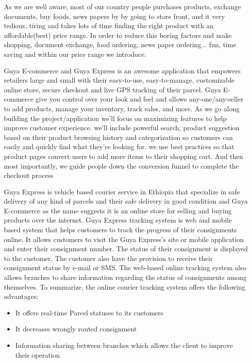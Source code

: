 As we are well aware, most of our country people purchases products, exchange documents, buy foods, news papers by by going to store front, and it very tedious, tiring and takes lots of time finding the right product with an affordable(best) price range. In order to reduce this boring factors and make shopping, document exchange, food ordering, news paper ordering... fun, time saving and within our price range we introduce.

Guya E-commerce and Guya Express is an awesome application that empowers retailers large and small with their easy-to-use, easy-to-manage, customizable online store, secure checkout and live GPS tracking of their parcel. Guya E-commerce give you control over your look and  feel and allows any-one/any-seller to add products, manage your inventory, track sales, and more. As we go along building the project/application we'll focus on maximizing features to help improve customer experience. we'll include powerful search, product suggestion based on their product browsing history and categorization so customers can easily and quickly find what they're looking for. we use best practices so that product pages convert users to add more items to their shopping cart. And then most importantly, we guide people down the conversion funnel to complete the checkout process

Guya Express is vehicle based courier service in Ethiopia that specialize in safe delivery of any kind of parcels and their safe delivery in good condition and Guya E-commerce as the name suggests it is an online store for selling and buying products over the internet. Guya Express tracking system is web and mobile based system that helps customers to track the progress of their consignments online. It allows customers to visit the Guya Express's site or mobile application and enter their consignment number. The status of their consignment is displayed to the customer. The customer also have the provision to receive their consignment status by e-mail or SMS. The web-based online tracking system also allows branches to share information regarding the status of consignments among themselves. To summarize, the online courier tracking system offers the following advantages:
\begin{itemize}
	\item It offers real-time Parcel statuses to its customers
	\item It decreases wrongly routed consignment
	\item Information sharing between branches which allows the  client to improve their operation 
\end{itemize}

